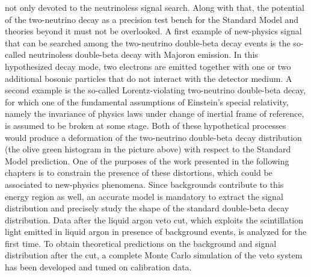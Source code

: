 not only devoted to the neutrinoless signal search. Along with that, the potential of the
two-neutrino decay as a precision test bench for the Standard Model and theories beyond it
must not be overlooked. A first example of new-physics signal that can be searched among
the two-neutrino double-beta decay events is the so-called neutrinoless double-beta decay
with Majoron emission. In this hypothesized decay mode, two electrons are emitted together
with one or two additional bosonic particles that do not interact with the detector
medium.  A second example is the so-called Lorentz-violating two-neutrino double-beta
decay, for which one of the fundamental assumptions of Einstein's special relativity,
namely the invariance of physics laws under change of inertial frame of reference, is
assumed to be broken at some stage. Both of these hypothetical processes would produce a
deformation of the two-neutrino double-beta decay distribution (the olive green histogram
in the picture above) with respect to the Standard Model prediction.  One of the purposes
of the work presented in the following chapters is to constrain the presence of these
distortions, which could be associated to new-physics phenomena. Since backgrounds
contribute to this energy region as well, an accurate model is mandatory to extract the
signal distribution and precisely study the shape of the standard double-beta decay
distribution. Data after the liquid argon veto cut, which exploits the scintillation light
emitted in liquid argon in presence of background events, is analyzed for the first time.
To obtain theoretical predictions on the background and signal distribution after the cut,
a complete Monte Carlo simulation of the veto system has been developed and tuned on
calibration data.

